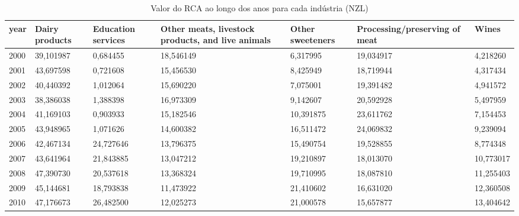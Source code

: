 \begin{table}
\centering
\caption{Valor do RCA ao longo dos anos para cada indústria (NZL)}
\begin{tabular}{p{1cm}p{2cm}p{2cm}p{2cm}p{2cm}p{2cm}p{2cm}}
\toprule
 year &  Dairy products &  Education services &  Other meats, livestock products, and live animals &  Other sweeteners &  Processing/preserving of meat &     Wines \\
\midrule
 2000 &       39,101987 &            0,684455 &                                          18,546149 &          6,317995 &                      19,034917 &  4,218260 \\
 2001 &       43,697598 &            0,721608 &                                          15,456530 &          8,425949 &                      18,719944 &  4,317434 \\
 2002 &       40,440392 &            1,012064 &                                          15,690220 &          7,075001 &                      19,391482 &  4,941572 \\
 2003 &       38,386038 &            1,388398 &                                          16,973309 &          9,142607 &                      20,592928 &  5,497959 \\
 2004 &       41,169103 &            0,903933 &                                          15,182546 &         10,391875 &                      23,611762 &  7,154453 \\
 2005 &       43,948965 &            1,071626 &                                          14,600382 &         16,511472 &                      24,069832 &  9,239094 \\
 2006 &       42,467134 &           24,727646 &                                          13,796375 &         15,490754 &                      19,528855 &  8,774348 \\
 2007 &       43,641964 &           21,843885 &                                          13,047212 &         19,210897 &                      18,013070 & 10,773017 \\
 2008 &       47,390730 &           20,537618 &                                          13,368324 &         19,710995 &                      18,087810 & 11,255403 \\
 2009 &       45,144681 &           18,793838 &                                          11,473922 &         21,410602 &                      16,631020 & 12,360508 \\
 2010 &       47,176673 &           26,482500 &                                          12,025273 &         21,000578 &                      15,657877 & 13,404642 \\

\end{tabular}
\end{table}
